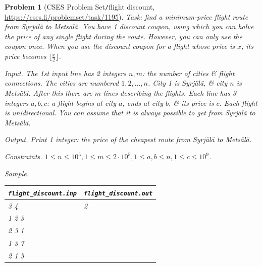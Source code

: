 \documentclass[oneside]{book}
\newtheorem{problem}{Problem}
\begin{document}
\begin{problem}[CSES Problem Set{\tt/}flight discount, \url{https://cses.fi/problemset/task/1195}]
	Task: find a minimum-price flight route from Syrjälä to Metsälä. You have 1 discount coupon, using which you can halve the price of any single flight during the route. However, you can only use the coupon once. When you use the discount coupon for a flight whose price is $x$, its price becomes $\lfloor\frac{x}{2}\rfloor$.
	\item {\sf Input.} The 1st input line has 2 integers $n,m$: the number of cities \& flight connections. The cities are numbered $1,2,\ldots,n$. City 1 is Syrjälä, \& city $n$ is Metsälä. After this there are $m$ lines describing the flights. Each line has 3 integers $a,b,c$: a flight begins at city $a$, ends at city $b$, \& its price is $c$. Each flight is unidirectional. You can assume that it is always possible to get from Syrjälä to Metsälä.
	\item {\sf Output.} Print 1 integer: the price of the cheapest route from Syrjälä to Metsälä.
	\item {\sf Constraints.} $1\le n\le10^5,1\le m\le2\cdot10^5,1\le a,b\le n,1\le c\le10^9$.
	\item {\sf Sample.}
	\begin{table}[H]
		\centering
		\begin{tabular}{|l|l|}
			\hline
			\verb|flight_discount.inp| & \verb|flight_discount.out| \\
			\hline
			3 4 & 2 \\
			1 2 3 & \\
			2 3 1 & \\
			1 3 7 & \\
			2 1 5 & \\
			\hline
		\end{tabular}
	\end{table}
\end{problem}
\end{document}
